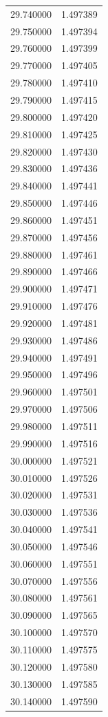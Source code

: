 \begin{tabular}{rr}
29.740000 & 1.497389 \\
29.750000 & 1.497394 \\
29.760000 & 1.497399 \\
29.770000 & 1.497405 \\
29.780000 & 1.497410 \\
29.790000 & 1.497415 \\
29.800000 & 1.497420 \\
29.810000 & 1.497425 \\
29.820000 & 1.497430 \\
29.830000 & 1.497436 \\
29.840000 & 1.497441 \\
29.850000 & 1.497446 \\
29.860000 & 1.497451 \\
29.870000 & 1.497456 \\
29.880000 & 1.497461 \\
29.890000 & 1.497466 \\
29.900000 & 1.497471 \\
29.910000 & 1.497476 \\
29.920000 & 1.497481 \\
29.930000 & 1.497486 \\
29.940000 & 1.497491 \\
29.950000 & 1.497496 \\
29.960000 & 1.497501 \\
29.970000 & 1.497506 \\
29.980000 & 1.497511 \\
29.990000 & 1.497516 \\
30.000000 & 1.497521 \\
30.010000 & 1.497526 \\
30.020000 & 1.497531 \\
30.030000 & 1.497536 \\
30.040000 & 1.497541 \\
30.050000 & 1.497546 \\
30.060000 & 1.497551 \\
30.070000 & 1.497556 \\
30.080000 & 1.497561 \\
30.090000 & 1.497565 \\
30.100000 & 1.497570 \\
30.110000 & 1.497575 \\
30.120000 & 1.497580 \\
30.130000 & 1.497585 \\
30.140000 & 1.497590 \\

\end{tabular}

